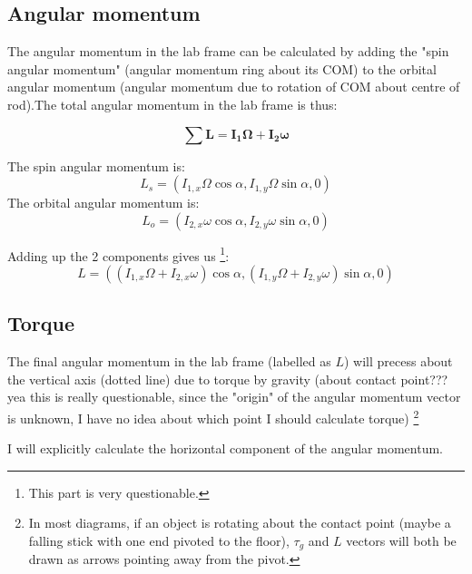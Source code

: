 \documentclass{scrartcl}
\begin{document}
\subsection{Angular momentum}
The angular momentum in the lab frame can be calculated by adding the "spin angular momentum" (angular momentum ring about its COM) to the orbital angular momentum (angular momentum due to rotation of COM about centre of rod).The total angular momentum in the lab frame is thus:

\begin{equation}
    \sum \mathbf{L}=\mathbf{I_1}\boldsymbol{\Omega} + \mathbf{I_2}\boldsymbol{\omega}
\end{equation}

The spin angular momentum is:
\begin{equation}
    L_s= (I_{1,x}\Omega \cos\alpha ,I_{1,y}\Omega \sin\alpha,0)
\end{equation}
The orbital angular momentum is:
\begin{equation}
    L_o= (I_{2,x}\omega \cos\alpha ,I_{2,y}\omega \sin\alpha,0)
\end{equation}

Adding up the 2 components gives us \footnote{This part is very questionable.}:
\begin{equation}
    L=((I_{1,x}\Omega +I_{2,x}\omega)\cos\alpha,(I_{1,y}\Omega +I_{2,y}\omega)\sin\alpha,0)
\end{equation}

\subsection{Torque}
The final angular momentum in the lab frame (labelled as $L$) will precess about the vertical axis (dotted line) due to torque by gravity (about contact point??? yea this is really questionable, since the "origin" of the angular momentum vector is unknown, I have no idea about which point I should calculate torque) \footnote{In most diagrams, if an object is rotating about the contact point (maybe a falling stick with one end pivoted to the floor), $\tau_g$ and $L$ vectors will both be drawn as arrows pointing away from the pivot.}

I will explicitly calculate the horizontal component of the angular momentum.
\end{document}
